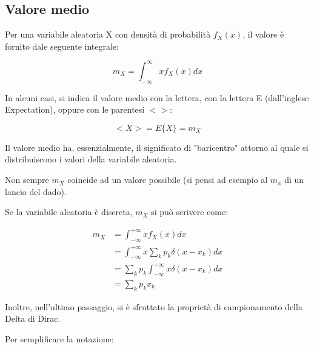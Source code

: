 \subsection{Valore medio}

Per una variabile aleatoria X con densità di probabilità $f_X (x)$, il valore è fornito dale seguente integrale: 

{
    \Large 
    \begin{equation}
        m_X = \int_{- \infty}^{\infty} x f_X (x) dx
    \end{equation}
}

In alcuni casi, si indica il valore medio con la lettera, con la lettera E (dall'inglese Expectation), oppure con le parentesi $< >$: 

{
    \Large 
    \begin{equation}
        <X> = E\{X\} = m_X
    \end{equation}
}

Il valore medio ha, essenzialmente, il significato di "baricentro" attorno al quale si distribuiscono i valori della variabile aleatoria. \newline 

Non sempre $m_X$ coincide ad un valore possibile (si pensi ad esempio al $m_x$ di un lancio del dado). \newline 

Se la variabile aleatoria è discreta, $m_X$ si può scrivere come: 

{
    \Large 
    \begin{equation}
        \begin{split}
            m_X 
            &= 
            \int_{-\infty}^{+\infty}
            x f_X (x) dx 
            \\ 
            &= 
            \int_{-\infty}^{+\infty}
            x \sum_{k} p_k \delta(x - x_k) dx
            \\  
            &= 
            \sum_{k} p_k 
            \int_{-\infty}^{+\infty}
            x \delta(x - x_k) dx 
            \\ 
            &= 
            \sum_{k}
            p_k x_k
        \end{split}
    \end{equation}
}

Inoltre, nell'ultimo passaggio, si è sfruttato la proprietà di campionamento della Delta di Dirac. \newline 

Per semplificare la notazione: 

